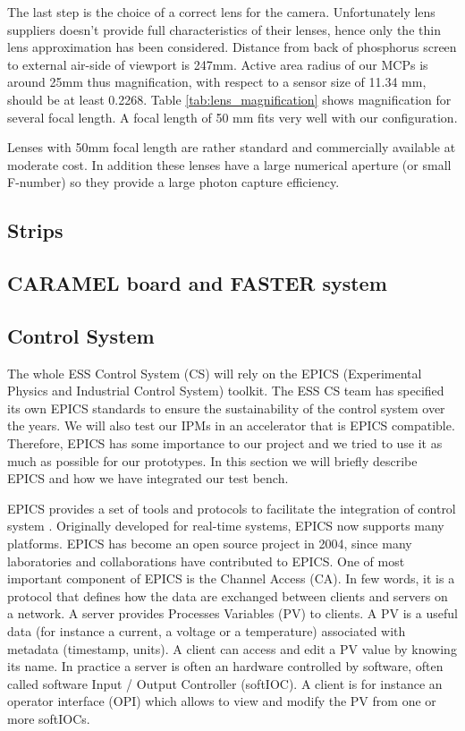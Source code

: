 \begin{refsection}
  The last step is the choice of a correct lens for the camera.
  Unfortunately lens suppliers doesn't provide full characteristics of their lenses, hence only the thin lens approximation has been considered.
  Distance from back of phosphorus screen to external air-side of viewport is 247mm. Active area radius of our MCPs is around 25mm thus magnification, with respect to a sensor size of 11.34 mm, should be at least 0.2268.
  Table \ref{tab:lens_magnification} shows magnification for several focal length. A focal length of 50 mm fits very well with our configuration.
  

  Lenses with 50mm focal length are rather standard and commercially available at moderate cost. In addition these lenses have a large numerical aperture (or small F-number) so they provide a large photon capture efficiency.

  \subsection{Strips}
  \subsection{CARAMEL board and FASTER system}
  \cite{ddc316}\cite{caramel2013}\cite{faster2013}\cite{rhb2012}
  \subsection{Control System}
  The whole ESS Control System (CS) will rely on the EPICS (Experimental Physics and Industrial Control System) toolkit. The ESS CS team has specified its own EPICS standards to ensure the sustainability of the control system over the years. We will also test our IPMs in an accelerator that is EPICS compatible. Therefore, EPICS has some importance to our project and we tried to use it as much as possible for our prototypes. In this section we will briefly describe EPICS and how we have integrated our test bench.

  EPICS provides a set of tools and protocols to facilitate the integration of control system \cite{epics2019}. Originally developed for real-time systems, EPICS now supports many platforms. EPICS has become an open source project in 2004, since many laboratories and collaborations have contributed to EPICS.
  One of most important component of EPICS is the Channel Access (CA). In few words, it is a protocol that defines how the data are exchanged between clients and servers on a network. A server provides Processes Variables (PV) to clients. A PV is a useful data (for instance a current, a voltage or a temperature) associated with metadata (timestamp, units). A client can access and edit a PV value by knowing its name. In practice a server is often an hardware controlled by software, often called software Input / Output Controller (softIOC). A client is for instance an operator interface (OPI) which allows to view and modify the PV from one or more softIOCs.


\end{refsection}
